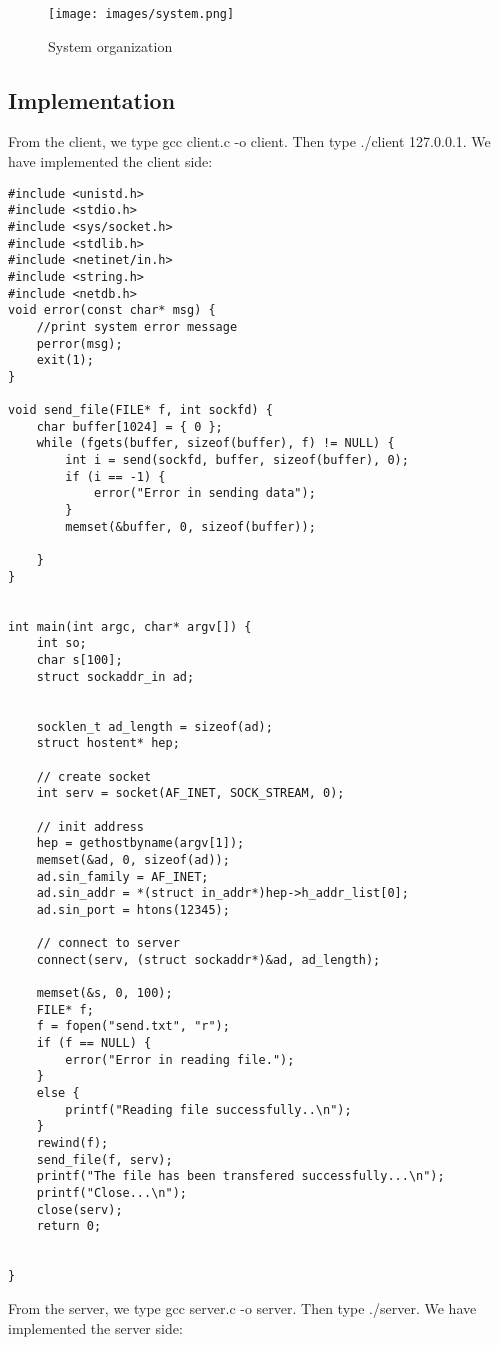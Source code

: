 \documentclass[13pt]{article}
\begin{document}
\begin{figure}[H]
    \centering
    \texttt{[image: images/system.png]}
    \caption{System organization}
\end{figure}

\subsection{Implementation}
\noindent%
From the client, we type gcc client.c -o client. Then type ./client 127.0.0.1.
\noindent%
We have implemented the client side:

\begin{verbatim}
#include <unistd.h>
#include <stdio.h>
#include <sys/socket.h>
#include <stdlib.h>
#include <netinet/in.h>
#include <string.h>
#include <netdb.h>
void error(const char* msg) {
	//print system error message
	perror(msg);
	exit(1);
}

void send_file(FILE* f, int sockfd) {
	char buffer[1024] = { 0 };
	while (fgets(buffer, sizeof(buffer), f) != NULL) {
		int i = send(sockfd, buffer, sizeof(buffer), 0);
		if (i == -1) {
			error("Error in sending data");
		}
		memset(&buffer, 0, sizeof(buffer));

	}
}


int main(int argc, char* argv[]) {
	int so;
	char s[100];
	struct sockaddr_in ad;


	socklen_t ad_length = sizeof(ad);
	struct hostent* hep;

	// create socket
	int serv = socket(AF_INET, SOCK_STREAM, 0);

	// init address
	hep = gethostbyname(argv[1]);
	memset(&ad, 0, sizeof(ad));
	ad.sin_family = AF_INET;
	ad.sin_addr = *(struct in_addr*)hep->h_addr_list[0];
	ad.sin_port = htons(12345);

	// connect to server
	connect(serv, (struct sockaddr*)&ad, ad_length);

	memset(&s, 0, 100);
	FILE* f;
	f = fopen("send.txt", "r");
	if (f == NULL) {
		error("Error in reading file.");
	}
	else {
		printf("Reading file successfully..\n");
	}
	rewind(f);
	send_file(f, serv);
	printf("The file has been transfered successfully...\n");
	printf("Close...\n");
	close(serv);
	return 0;


}

\end{verbatim}
\noindent%
From the server, we type gcc server.c -o server. Then type ./server.
\noindent%
We have implemented the server side:
\end{document}

